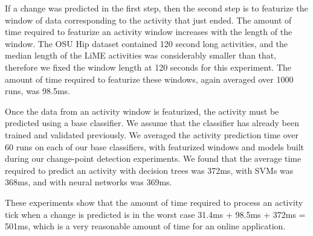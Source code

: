 If a change was predicted in the first step, then the second step is to
featurize the window of data corresponding to the activity that just ended.
The amount of time required to featurize an activity window increases with the
length of the window. The OSU Hip dataset contained 120 second long activities,
and the median length of the LiME activities was considerably smaller than that,
therefore we fixed the window length at 120 seconds for this experiment. The
amount of time required to featurize these windows, again averaged over 1000 runs,
was 98.5ms.

Once the data from an activity window is featurized, the activity must be
predicted using a base classifier. We assume that the classifier has already
been trained and validated previously. We averaged the activity prediction time
over 60 runs on each of our base classifiers, with featurized windows and models
built during our change-point detection experiments. We found that the average
time required to predict an activity with decision trees was 372ms, with
SVMs was 368ms, and with neural networks was 369ms.

These experiments show that the amount of time required to process an activity
tick when a change is predicted is in the worst case
31.4ms + 98.5ms + 372ms = 501ms, which is a very reasonable amount of time
for an online application.
